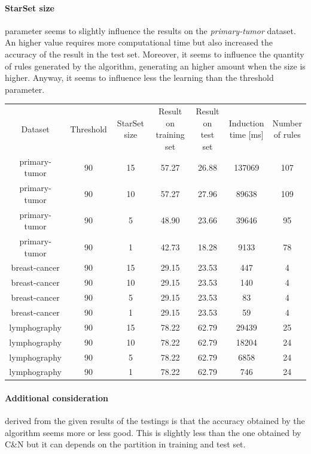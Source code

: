 \documentclass{article}
\begin{document}
\paragraph{StarSet size} parameter seems to slightly influence the results on the \textit{primary-tumor} dataset. An higher value requires more computational time but also increased the accuracy of the result in the test set. Moreover, it seems to influence the quantity of rules generated by the algorithm, generating an higher amount when the size is higher. Anyway, it seems to influence less the learning than the threshold parameter.
\begin{center}
    \begin{tabular}{ccccccc}
        Dataset & Threshold & StarSet size & \makecell{Result on\\training set} & \makecell{Result on\\test set} & \makecell{Induction\\time [ms]} & \makecell{Number\\of rules} \\

        primary-tumor & 90 & 15 & 57.27 & 26.88 & 137069 & 107 \\
        primary-tumor & 90 & 10 & 57.27 & 27.96 & 89638 & 109 \\
        primary-tumor & 90 & 5 & 48.90 & 23.66 & 39646 & 95 \\
        primary-tumor & 90 & 1 & 42.73 & 18.28 & 9133 & 78 \\

        breast-cancer & 90 & 15 & 29.15 & 23.53 & 447 & 4 \\
        breast-cancer & 90 & 10 & 29.15 & 23.53 & 140 & 4 \\
        breast-cancer & 90 & 5 & 29.15 & 23.53 & 83 & 4 \\
        breast-cancer & 90 & 1 & 29.15 & 23.53 & 59 & 4 \\

        lymphography & 90 & 15 & 78.22 & 62.79 & 29439 & 25 \\
        lymphography & 90 & 10 & 78.22 & 62.79 & 18204 & 24 \\
        lymphography & 90 & 5 & 78.22 & 62.79 & 6858 & 24 \\
        lymphography & 90 & 1 & 78.22 & 62.79 & 746 & 24
    \end{tabular}
\end{center}

\paragraph{Additional consideration} derived from the given results of the testings is that the accuracy obtained by the algorithm seems more or less good. This is slightly less than the one obtained by C\&N but it can depends on the partition in training and test set.
\end{document}
